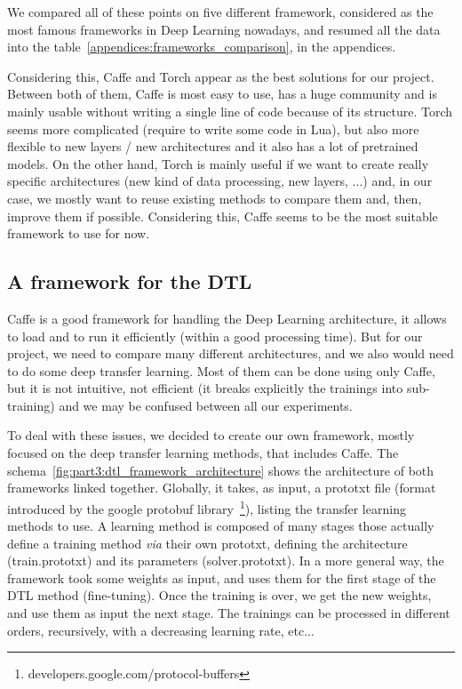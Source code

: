 We compared all of these points on five different framework, considered as the most famous frameworks in Deep Learning nowadays, and resumed all the data into the table~\ref{appendices:frameworks_comparison}, in the appendices.

Considering this, Caffe and Torch appear as the best solutions for our project. Between both of them, Caffe is most easy to use, has a huge community and is mainly usable without writing a single line of code because of its structure. Torch seems more complicated (require to write some code in Lua), but also more flexible to new layers / new architectures and it also has a lot of pretrained models. On the other hand, Torch is mainly useful if we want to create really specific architectures (new kind of data processing, new layers, ...) and, in our case, we mostly want to reuse existing methods to compare them and, then, improve them if possible. Considering this, Caffe seems to be the most suitable framework to use for now.


\subsection{A framework for the DTL}
Caffe is a good framework for handling the Deep Learning architecture, it allows to load and to run it efficiently (within a good processing time). But for our project, we need to compare many different architectures, and we also would need to do some deep transfer learning. Most of them can be done using only Caffe, but it is not intuitive, not efficient (it breaks explicitly the trainings into sub-training) and we may be confused between all our experiments.

To deal with these issues, we decided to create our own framework, mostly focused on the deep transfer learning methods, that includes Caffe. The schema~\ref{fig:part3:dtl_framework_architecture} shows the architecture of both frameworks linked together. Globally, it takes, as input, a prototxt file (format introduced by the google protobuf library~\footnote{developers.google.com/protocol-buffers}), listing the transfer learning methods to use. A learning method is composed of many stages those actually define a training method \textit{via} their own prototxt, defining the architecture (train.prototxt) and its parameters (solver.prototxt).
In a more general way, the framework took some weights as input, and uses them for the first stage of the DTL method (fine-tuning). Once the training is over, we get the new weights, and use them as input the next stage. The trainings can be processed in different orders, recursively, with a decreasing learning rate, etc...

